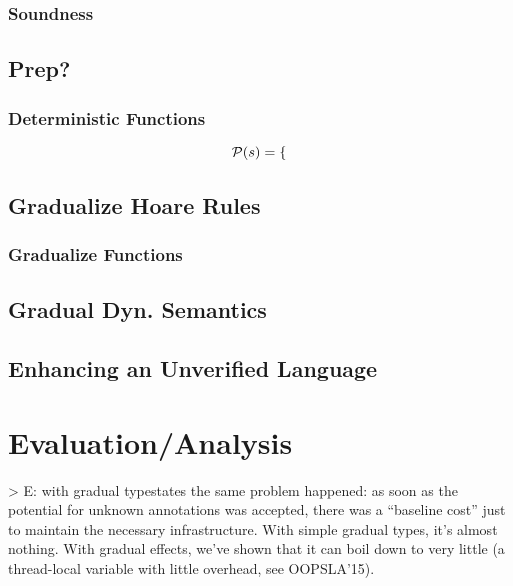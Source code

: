 \subsection{Soundness}

\section{Prep?}

\subsection{Deterministic Functions}
\begin{displaymath}
\mathcal{P}(s) =
\begin{cases}

\end{cases}
\end{displaymath}

\section{Gradualize Hoare Rules}

\subsection{Gradualize Functions}


\section{Gradual Dyn. Semantics}


\section{Enhancing an Unverified Language}


\chapter{Evaluation/Analysis}
> E:
with gradual typestates the same problem happened: as soon as the potential for unknown annotations was accepted, there was a “baseline cost” just to maintain the necessary infrastructure.
With simple gradual types, it’s almost nothing. With gradual effects, we’ve shown that it can boil down to very little (a thread-local variable with little overhead, see OOPSLA’15). 

